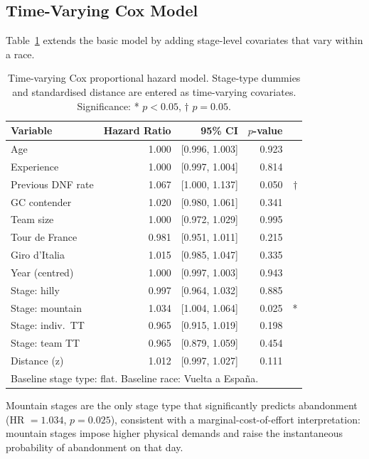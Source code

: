 \subsection{Time-Varying Cox Model}

Table~\ref{tab:cox_timevarying} extends the basic model by adding stage-level covariates that vary within a race.

\begin{table}[H]
\centering
\caption{Time-varying Cox proportional hazard model. Stage-type dummies and standardised distance are entered as time-varying covariates. Significance: * $p<0.05$, $\dagger$ $p=0.05$.}
\label{tab:cox_timevarying}
\small
\renewcommand{\arraystretch}{1.3}
\begin{tabular}{@{} lrrrr @{}}
\toprule
Variable & Hazard Ratio & 95\% CI & $p$-value & \\
\midrule
Age                 & 1.000 & [0.996, 1.003] & 0.923 & \\
Experience          & 1.000 & [0.997, 1.004] & 0.814 & \\
Previous DNF rate   & 1.067 & [1.000, 1.137] & 0.050 & $\dagger$ \\
GC contender        & 1.020 & [0.980, 1.061] & 0.341 & \\
Team size           & 1.000 & [0.972, 1.029] & 0.995 & \\
Tour de France      & 0.981 & [0.951, 1.011] & 0.215 & \\
Giro d'Italia       & 1.015 & [0.985, 1.047] & 0.335 & \\
Year (centred)      & 1.000 & [0.997, 1.003] & 0.943 & \\
Stage: hilly        & 0.997 & [0.964, 1.032] & 0.885 & \\
Stage: mountain     & 1.034 & [1.004, 1.064] & 0.025 & * \\
Stage: indiv.\ TT   & 0.965 & [0.915, 1.019] & 0.198 & \\
Stage: team TT      & 0.965 & [0.879, 1.059] & 0.454 & \\
Distance (z)        & 1.012 & [0.997, 1.027] & 0.111 & \\
\bottomrule
\multicolumn{5}{l}{\footnotesize Baseline stage type: flat. Baseline race: Vuelta a Espa\~{n}a.}
\end{tabular}
\end{table}

Mountain stages are the only stage type that significantly predicts abandonment (HR $= 1.034$, $p = 0.025$), consistent with a marginal-cost-of-effort interpretation: mountain stages impose higher physical demands and raise the instantaneous probability of abandonment on that day.

